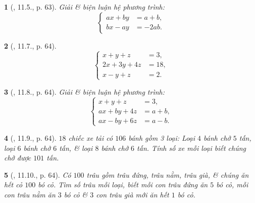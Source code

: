 \documentclass{article}
\newtheorem{baitoan}{}
\begin{document}
\begin{baitoan}[\cite{TLCT_THCS_Toan_9_dai_so}, 11.5., p. 63]
	Giải \& biện luận hệ phương trình:
	\begin{equation*}
		\left\{\begin{split}
			ax + by &= a + b,\\
			bx - ay &= -2ab.
		\end{split}\right.
	\end{equation*}
\end{baitoan}

\begin{baitoan}[\cite{TLCT_THCS_Toan_9_dai_so}, 11.7., p. 64]
	\begin{equation*}
		\left\{\begin{split}
			x + y + z &= 3,\\
			2x + 3y + 4z &= 18,\\
			x - y + z &= 2.
		\end{split}\right.
	\end{equation*}
\end{baitoan}

\begin{baitoan}[\cite{TLCT_THCS_Toan_9_dai_so}, 11.8., p. 64]
	Giải \& biện luận hệ phương trình:
	\begin{equation*}
		\left\{\begin{split}
			x + y + z &= 3,\\
			ax + by + 4z &= a + b,\\
			ax - by + 6z &= a - b.
		\end{split}\right.
	\end{equation*}
\end{baitoan}

\begin{baitoan}[\cite{TLCT_THCS_Toan_9_dai_so}, 11.9., p. 64]
	$18$ chiếc xe tải có $106$ bánh gồm 3 loại: Loại $4$ bánh chở $5$ tấn, loại $6$ bánh chở $6$ tấn, \& loại $8$ bánh chở $6$ tấn. Tính số xe mỗi loại biết chúng chở được $101$ tấn.
\end{baitoan}

\begin{baitoan}[\cite{TLCT_THCS_Toan_9_dai_so}, 11.10., p. 64]
	Có $100$ trâu gồm trâu đứng, trâu nằm, trâu già, \& chúng ăn hết cỏ $100$ bó cỏ. Tìm số trâu mỗi loại, biết mỗi con trâu đứng ăn $5$ bó cỏ, mỗi con trâu nằm ăn $3$ bó cỏ \& $3$ con trâu già mới ăn hết $1$ bó cỏ.
\end{baitoan}

\end{document}
